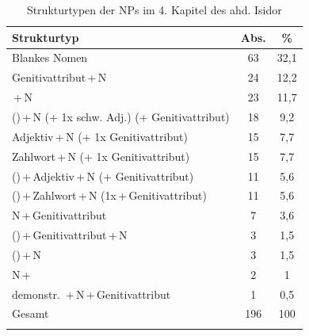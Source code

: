 \begin{table}
\centering
\caption{Strukturtypen der NPs im 4. Kapitel des ahd. Isidor \\ \parencite{Flick2018}}
\label{NP-Flick}
\begin{tabular}{lS[table-format=2.0]S[table-format=2.1]}
\lsptoprule
{Strukturtyp}                                   & {Abs.} & {\%}  \\ \midrule
Blankes Nomen                                          & 63            & 32,1         \\
Genitivattribut\,+\,N                                    & 24            & 12,2         \\
\,+\,N                                          & 23            & 11,7         \\
 ()\,+\,N (+ 1x schw. Adj.) (+ Genitivattribut) & 18            & 9,2          \\
Adjektiv\,+\,N (+ 1x Genitivattribut)                    & 15            & 7,7          \\
Zahlwort\,+\,N (+ 1x Genitivattribut)                    & 15            & 7,7          \\
 ()\,+\,Adjektiv\,+\,N (+ Genitivattribut)        & 11            & 5,6          \\
 ()\,+\,Zahlwort\,+\,N (1x\,+\,Genitivattribut)     & 11            & 5,6          \\
N\,+\,Genitivattribut                                    & 7             & 3,6          \\
 ()\,+\,Genitivattribut\,+\,N                     & 3             & 1,5          \\
 ()\,+\,N                                     & 3             & 1,5          \\
N\,+\,                                          & 2             & 1            \\
demonstr. \,+\,N\,+\,Genitivattribut                   & 1             & 0,5          \\\midrule
{Gesamt}                                        & {196}  & {100} \\ \lspbottomrule
\end{tabular}
\end{table}

